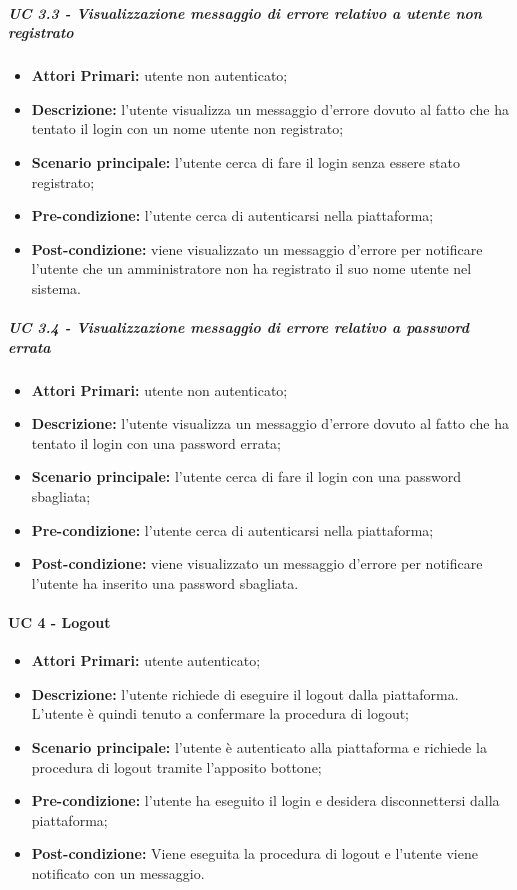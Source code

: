 \subparagraph{UC 3.3 - Visualizzazione messaggio di errore relativo a utente non registrato}
\begin{itemize}
	\item \textbf{Attori Primari:} utente non autenticato;
	\item \textbf{Descrizione:} l'utente visualizza un messaggio d'errore dovuto al fatto che ha tentato il login con un nome utente non registrato;
	\item \textbf{Scenario principale:} l'utente cerca di fare il login senza essere stato registrato;
	\item \textbf{Pre-condizione:} l'utente cerca di autenticarsi nella piattaforma;
	\item \textbf{Post-condizione:} viene visualizzato un messaggio d'errore per notificare l'utente che un amministratore non ha registrato il suo nome utente nel sistema.
\end{itemize}

\subparagraph{UC 3.4 - Visualizzazione messaggio di errore relativo a password errata}
\begin{itemize}
	\item \textbf{Attori Primari:} utente non autenticato;
	\item \textbf{Descrizione:} l'utente visualizza un messaggio d'errore dovuto al fatto che ha tentato il login con una password errata;
	\item \textbf{Scenario principale:} l'utente cerca di fare il login con una password sbagliata;
	\item \textbf{Pre-condizione:} l'utente cerca di autenticarsi nella piattaforma;
	\item \textbf{Post-condizione:} viene visualizzato un messaggio d'errore per notificare l'utente ha inserito una password sbagliata.
\end{itemize}

\paragraph{UC 4 - Logout}
\begin{itemize}
	\item \textbf{Attori Primari:} utente autenticato;
	\item \textbf{Descrizione:} l'utente richiede di eseguire il logout dalla piattaforma. L'utente è quindi tenuto a confermare la procedura di logout;
	\item \textbf{Scenario principale:} l'utente è autenticato alla piattaforma e richiede la procedura di logout tramite l'apposito bottone;
	\item \textbf{Pre-condizione:} l'utente ha eseguito il login e desidera disconnettersi dalla piattaforma;
	\item \textbf{Post-condizione:} Viene eseguita la procedura di logout e l'utente viene notificato con un messaggio.
\end{itemize}

